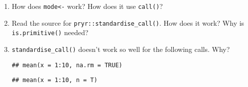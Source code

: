 \begin{enumerate}
\begin{Shaded}
\begin{Highlighting}[]
\NormalTok{(}\NormalTok{(} \NormalTok{))}
\NormalTok{(} \NormalTok{)}
\end{Highlighting}
\end{Shaded}
\item
  How does \texttt{mode\textless{}-} work? How does it use
  \texttt{call()}?
\item
  Read the source for \texttt{pryr::standardise\_call()}. How does it
  work? Why is \texttt{is.primitive()} needed?
\item
  \texttt{standardise\_call()} doesn't work so well for the following
  calls. Why?

\begin{Shaded}
\begin{Highlighting}[]
\NormalTok{(}\NormalTok{(}\NormalTok{(}\OperatorTok{:}\NormalTok{, } \NormalTok{)))}
\end{Highlighting}
\end{Shaded}

\begin{verbatim}
## mean(x = 1:10, na.rm = TRUE)
\end{verbatim}

\begin{Shaded}
\begin{Highlighting}[]
\NormalTok{(}\NormalTok{(}\NormalTok{(}\OperatorTok{:}\NormalTok{)))}
\end{Highlighting}
\end{Shaded}

\begin{verbatim}
## mean(x = 1:10, n = T)
\end{verbatim}

\begin{Shaded}
\begin{Highlighting}[]
\NormalTok{(}\NormalTok{(}\NormalTok{(} \OperatorTok{:}\NormalTok{, , }\NormalTok{)))}
\end{Highlighting}
\end{Shaded}


\end{enumerate}
